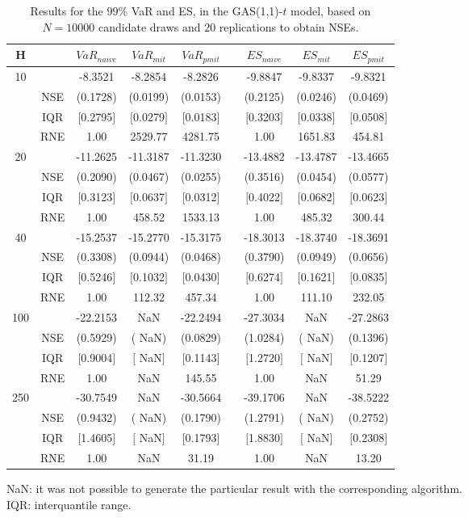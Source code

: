 \footnotesize{  
{ \renewcommand{\arraystretch}{1.3} 
\begin{table}[h] 
\centering 
\caption{Results for the $99\%$ VaR and ES, in the GAS(1,1)-$t$ model, based on $N=10000$ candidate draws and $20$ replications to obtain NSEs.} 
\label{tab:res_algos_t_gas_ML} 
\begin{tabular}{ccccccccc}  
 H & & $VaR_{naive}$ & $VaR_{mit}$ & $VaR_{pmit}$ &  & $ES_{naive}$ & $ES_{mit}$ & $ES_{pmit}$ \\ \hline 
10 & & -8.3521 & -8.2854 & -8.2826 & & -9.8847 & -9.8337 & -9.8321  \\ 
  & NSE & (0.1728) & (0.0199) & (0.0153) & & (0.2125) & (0.0246) & (0.0469)   \\ 
 & IQR & $[$0.2795$]$ & $[$0.0279$]$ & $[$0.0183$]$ & & $[$0.3203$]$ & $[$0.0338$]$ & $[$0.0508$]$  \\  
  & RNE &   1.00 & 2529.77 & 4281.75 & &   1.00 & 1651.83 & 454.81   \\ [1ex] 
20 & & -11.2625 & -11.3187 & -11.3230 & & -13.4882 & -13.4787 & -13.4665  \\ 
  & NSE & (0.2090) & (0.0467) & (0.0255) & & (0.3516) & (0.0454) & (0.0577)   \\ 
 & IQR & $[$0.3123$]$ & $[$0.0637$]$ & $[$0.0312$]$ & & $[$0.4022$]$ & $[$0.0682$]$ & $[$0.0623$]$  \\  
  & RNE &   1.00 & 458.52 & 1533.13 & &   1.00 & 485.32 & 300.44   \\ [1ex] 
40 & & -15.2537 & -15.2770 & -15.3175 & & -18.3013 & -18.3740 & -18.3691  \\ 
  & NSE & (0.3308) & (0.0944) & (0.0468) & & (0.3790) & (0.0949) & (0.0656)   \\ 
 & IQR & $[$0.5246$]$ & $[$0.1032$]$ & $[$0.0430$]$ & & $[$0.6274$]$ & $[$0.1621$]$ & $[$0.0835$]$  \\  
  & RNE &   1.00 & 112.32 & 457.34 & &   1.00 & 111.10 & 232.05   \\ [1ex] 
100 & & -22.2153 &    NaN & -22.2494 & & -27.3034 &    NaN & -27.2863  \\ 
  & NSE & (0.5929) & (   NaN) & (0.0829) & & (1.0284) & (   NaN) & (0.1396)   \\ 
 & IQR & $[$0.9004$]$ & $[$   NaN$]$ & $[$0.1143$]$ & & $[$1.2720$]$ & $[$   NaN$]$ & $[$0.1207$]$  \\  
  & RNE &   1.00 &    NaN & 145.55 & &   1.00 &    NaN &  51.29   \\ [1ex] 
250 & & -30.7549 &    NaN & -30.5664 & & -39.1706 &    NaN & -38.5222  \\ 
  & NSE & (0.9432) & (   NaN) & (0.1790) & & (1.2791) & (   NaN) & (0.2752)   \\ 
 & IQR & $[$1.4605$]$ & $[$   NaN$]$ & $[$0.1793$]$ & & $[$1.8830$]$ & $[$   NaN$]$ & $[$0.2308$]$  \\  
  & RNE &   1.00 &    NaN &  31.19 & &   1.00 &    NaN &  13.20   \\ [1ex] 
\hline 
\end{tabular} 
\raggedright 

\vspace{5pt}\footnotesize{NaN: it was not possible to generate the particular result with the corresponding algorithm.} \\ 
\vspace{5pt}\footnotesize{IQR: interquantile range.} 
\end{table} 
} 
} 
